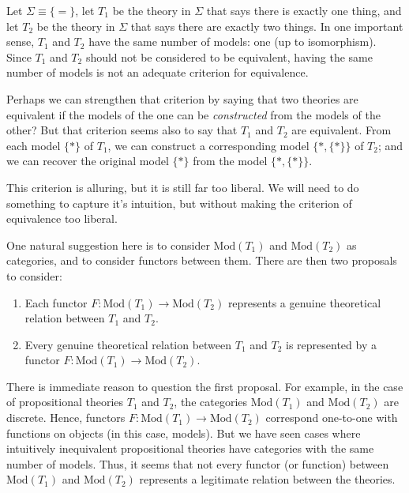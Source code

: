 \begin{example} Let $\Sigma \equiv \{ =\}$, let $T_1$ be the theory in
  $\Sigma$ that says there is exactly one thing, and let $T_2$ be the
  theory in $\Sigma$ that says there are exactly two things.  In one
  important sense, $T_1$ and $T_2$ have the same number of models: one
  (up to isomorphism).  Since $T_1$ and $T_2$ should not be considered
  to be equivalent, having the same number of models is not an
  adequate criterion for equivalence.

  Perhaps we can strengthen that criterion by saying that two theories
  are equivalent if the models of the one can be \textit{constructed}
  from the models of the other?  But that criterion seems also to say
  that $T_1$ and $T_2$ are equivalent.  From each model $\{ \ast \}$
  of $T_1$, we can construct a corresponding model $\{ \ast ,\{ \ast
  \} \}$ of $T_2$; and we can recover the original model $\{ \ast \}$
  from the model $\{ \ast ,\{ \ast \} \}$.  

  This criterion is alluring, but it is still far too liberal.  We
  will need to do something to capture it's intuition, but without
  making the criterion of equivalence too liberal.  

  One natural suggestion here is to consider $\mathrm{Mod}(T _1)$ and
  $\mathrm{Mod}(T_2)$ as categories, and to consider functors between
  them.  There are then two proposals to consider:
\begin{enumerate}
\item Each functor $F:\mathrm{Mod}(T_1)\to \mathrm{Mod}(T_2)$
  represents a genuine theoretical relation between $T_1$ and $T_2$.
\item Every genuine theoretical relation between $T_1$ and $T_2$ is
  represented by a functor $F:\mathrm{Mod}(T_1)\to\mathrm{Mod}(T_2)$.
\end{enumerate}
There is immediate reason to question the first proposal.  For
example, in the case of propositional theories $T_1$ and $T_2$, the
categories $\mathrm{Mod}(T_1)$ and $\mathrm{Mod}(T_2)$ are discrete.
Hence, functors $F:\mathrm{Mod}(T_1)\to\mathrm{Mod}(T_2)$ correspond
one-to-one with functions on objects (in this case, models).  But we
have seen cases where intuitively inequivalent propositional theories
have categories with the same number of models.  Thus, it seems that
not every functor (or function) between $\mathrm{Mod}(T_1)$ and
$\mathrm{Mod}(T_2)$ represents a legitimate relation between the
theories.


\end{example}
